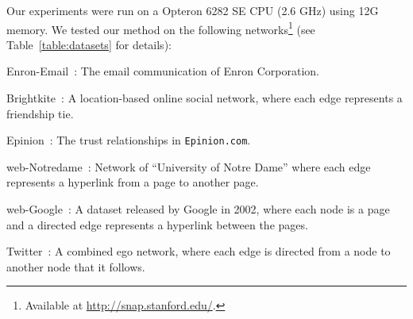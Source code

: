 Our experiments were run on a Opteron 6282 SE CPU (2.6 GHz) using 12G memory. We tested our method on the following networks\footnote{Available at \url{http://snap.stanford.edu/}.} (see Table~\ref{table:datasets} for details): 
\begin{itemize*}
 \item Enron-Email~\cite{klimt2004introducing}: The email communication of Enron Corporation.
 \item Brightkite~\cite{ChoML11}: A location-based online social network, where each edge represents a friendship tie.
 \item Epinion~\cite{richardson2003trust}: The trust relationships in \texttt{Epinion.com}.
  \item web-Notredame~\cite{notredame}: Network of ``University of Notre Dame'' where each edge represents a hyperlink from a page to another page.
 \item web-Google~\cite{webgoogle}: A dataset released by Google in 2002, where each node is a page and a directed edge represents a hyperlink between the pages.
 \item Twitter~\cite{McAuleyL12}: A combined ego network, where each edge is directed from a node to another node that it follows. 
\end{itemize*}


